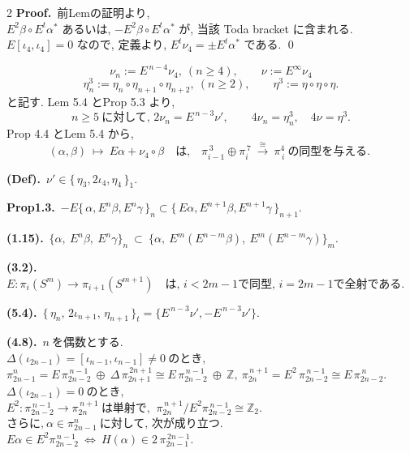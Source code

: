 \documentclass[10pt, leqno]{ltjsarticle}
\newcommand{\Ex}{E}        %
\newcommand{\todai}[2][]{\{\,#2\,\}_{#1}}      %
\newcommand{\pis}[2]{\pi_{#1}(#2)}       %
\newcommand{\pit}[2]{\pi_{#1}^{#2}}
\numberwithin{equation}{section}
\theoremstyle{plain}
\theoremstyle{definition}
\theoremstyle{remark}
\begin{document}
\begin{paracol}{2}
\noindent
\textbf{Proof.}\ 
前Lemの証明より, \\
\(E^{2}\beta\circ E^{t}\alpha^{\ast}\) あるいは,
\(-E^{2}\beta\circ E^{t}\alpha^{\ast}\) 
が, 当該 Toda bracket に含まれる. \\
\(E[\iota_4,\iota_4]=0\) なので, 定義より,
\(E^{t}\nu_{4}=\pm E^{t}\alpha^{\ast}\) である. 
\qed

\[
\nu_n:=E^{\,n-4}\nu_{4},\ (n\ge 4),\qquad \nu:=E^{\infty}\nu_{4}
\]
\[
\eta^{3}_{n}:=\eta_{n}\circ\eta_{n+1}\circ\eta_{n+2},\ (n\ge2),\qquad
\eta^{3}:=\eta\circ\eta\circ\eta .
\]
と記す.
Lem 5.4 とProp 5.3 より,
\begin{equation}\label{eq:5.5}
n\ge5\ \text{に対して, } 2\nu_n=E^{\,n-3}\nu',\qquad
4\nu_{n}=\eta_n^{3},\quad 4\nu=\eta^{3}.
\end{equation}
\noindent
Prop 4.4 とLem 5.4 から,
\begin{equation}\label{eq:5.6}
(\alpha,\beta)\ \longmapsto\ E\alpha+\nu_{4}\circ\beta
\quad\text{は,}\quad
\pi^{\,3}_{i-1}\oplus \pi^{\,7}_{i}\ \xrightarrow{\ \cong\ }\ \pi_{\,i}^{4}
\ \text{の同型を与える. }
\end{equation}

\switchcolumn

\noindent
\textbf{(Def).}\
\(\nu'\in\todai[1]{\eta_3,2\iota_4,\eta_4}\).

\noindent
\textbf{Prop1.3.}\
\(-E\todai[n]{\alpha, E^n\beta, E^n\gamma}
\subset \todai[n+1]{E\alpha, E^{n+1}\beta, E^{n+1}\gamma}\).

\noindent
\textbf{(1.15).}\
\(\{\alpha,\ \Ex^n\beta,\ \Ex^n\gamma\}_n
\ \subset\
\bigl\{\alpha,\ \Ex^{m}(E^{n-m}\beta),\ E^{m}(E^{n-m}\gamma)\bigr\}_m .\)

\noindent
\textbf{(3.2).}\
\(\Ex: \pis{i}{S^m} \longrightarrow \pis{i+1}{S^{m+1}}
\quad\text{は, } i<2m-1 \text{で同型, } i=2m-1 \text{で全射である. }\)

\noindent
\textbf{(5.4).}\
\(\todai[t]{\eta_{n},\,2\iota_{n+1},\,\eta_{n+1}} = \{E^{\,n-3}\nu',-E^{\,n-3}\nu'\}.\)

\noindent
\textbf{(4.8).}\
\( n \ \text{を偶数とする. } \)\\
\(\Delta(\iota_{2n-1})=[\iota_{n-1},\iota_{n-1}]\ne0 \ \text{のとき, }\)\\
\(\pit{2n-1}{n}
=E\,\pit{2n-2}{\,n-1}\ \oplus\ \Delta\,\pit{2n+1}{\,2n+1}
\cong E\,\pit{2n-2}{\,n-1}\ \oplus\ \mathbb{Z},\ \pit{2n}{\,n+1} = E^{2}\,\pit{2n-2}{\,n-1} 
\cong E\,\pit{2n-2}{\,n}.\)\\
\(\Delta(\iota_{2n-1})=0 \ \text{のとき, }\)\\
\(E^{2}:\pit{2n-2}{\,n-1}\to\pit{2n}{\,n+1}\ \text{は単射で, }\
\pit{2n}{\,n+1}/E^{2}\pit{2n-2}{\,n-1}\cong\mathbb{Z}_2 . \)\\
\(\text{さらに,}\ \alpha\in\pit{2n-1}{n} \ \text{に対して, 次が成り立つ. }\)\\
\(E\alpha\in E^{2}\pit{2n-2}{\,n-1} \ \Leftrightarrow \
H(\alpha)\in 2\,\pit{2n-1}{\,2n-1} .\)


\end{paracol}
\end{document}
